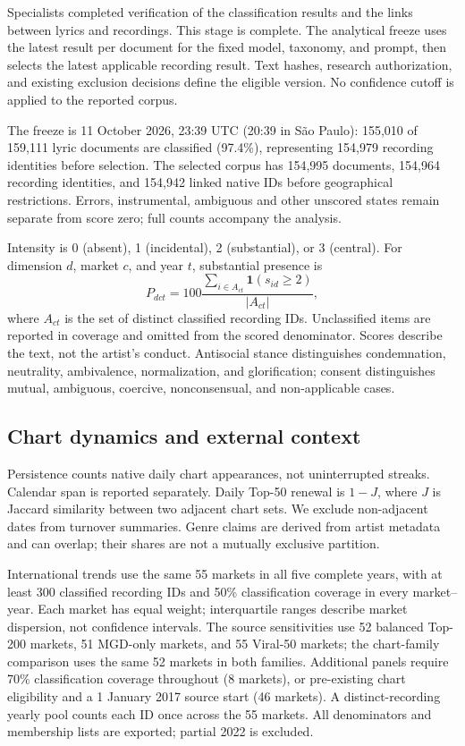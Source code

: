 \documentclass[10pt,a4paper,twocolumn]{article}
\begin{document}
Specialists completed verification of the classification results and the links between lyrics and recordings. This stage is complete. The analytical freeze uses the latest result per document for the fixed model, taxonomy, and prompt, then selects the latest applicable recording result. Text hashes, research authorization, and existing exclusion decisions define the eligible version. No confidence cutoff is applied to the reported corpus.

The freeze is 11 October 2026, 23:39 UTC (20:39 in S\~ao Paulo): 155,010 of 159,111 lyric documents are classified (97.4\%), representing 154,979 recording identities before selection. The selected corpus has 154,995 documents, 154,964 recording identities, and 154,942 linked native IDs before geographical restrictions. Errors, instrumental, ambiguous and other unscored states remain separate from score zero; full counts accompany the analysis.

Intensity is 0 (absent), 1 (incidental), 2 (substantial), or 3 (central). For dimension $d$, market $c$, and year $t$, substantial presence is
\begin{equation}
 P_{dct}=100\frac{\sum_{i\in A_{ct}}\mathbf{1}(s_{id}\geq2)}{|A_{ct}|},
\end{equation}
where $A_{ct}$ is the set of distinct classified recording IDs. Unclassified items are reported in coverage and omitted from the scored denominator. Scores describe the text, not the artist's conduct. Antisocial stance distinguishes condemnation, neutrality, ambivalence, normalization, and glorification; consent distinguishes mutual, ambiguous, coercive, nonconsensual, and non-applicable cases.

\subsection{Chart dynamics and external context}
Persistence counts native daily chart appearances, not uninterrupted streaks. Calendar span is reported separately. Daily Top-50 renewal is $1-J$, where $J$ is Jaccard similarity between two adjacent chart sets. We exclude non-adjacent dates from turnover summaries. Genre claims are derived from artist metadata and can overlap; their shares are not a mutually exclusive partition.

International trends use the same 55 markets in all five complete years, with at least 300 classified recording IDs and 50\% classification coverage in every market--year. Each market has equal weight; interquartile ranges describe market dispersion, not confidence intervals. The source sensitivities use 52 balanced Top-200 markets, 51 MGD-only markets, and 55 Viral-50 markets; the chart-family comparison uses the same 52 markets in both families. Additional panels require 70\% classification coverage throughout (8 markets), or pre-existing chart eligibility and a 1 January 2017 source start (46 markets). A distinct-recording yearly pool counts each ID once across the 55 markets. All denominators and membership lists are exported; partial 2022 is excluded.
\end{document}
